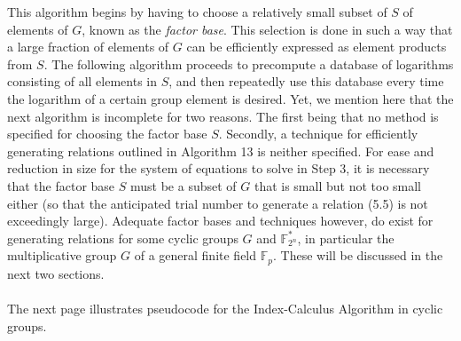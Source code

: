 \documentclass[iwp,first]{luthesis}
\begin{document}
This algorithm begins by having to choose a relatively small subset of $S$ of elements of $G$, known as the \textit{factor base}. This selection is done in such a way that a large fraction of elements of $G$ can be efficiently expressed as element products from $S$. The following algorithm proceeds to precompute a database of logarithms consisting of all elements in $S$, and then repeatedly use this database every time the logarithm of a certain group element is desired. Yet, we mention here that the next algorithm is incomplete for two reasons. The first being that no method is specified for choosing the factor base $S$. Secondly, a technique for efficiently generating relations outlined in Algorithm 13 is neither specified. For ease and reduction in size for the system of equations to solve in Step 3, it is necessary that the factor base $S$ must be a subset of $G$ that is small but not too small either (so that the anticipated trial number to generate a relation (5.5) is not exceedingly large). Adequate factor bases and techniques however, do exist for generating relations for some cyclic groups $G$ and $\mathbb{F}_{2^n}^{*}$, in particular the multiplicative group $G$ of a general finite field $\mathbb{F}_p$. These will be discussed in the next two sections.
\\
\\
The next page illustrates pseudocode for the Index-Calculus Algorithm in cyclic groups.
\end{document}
